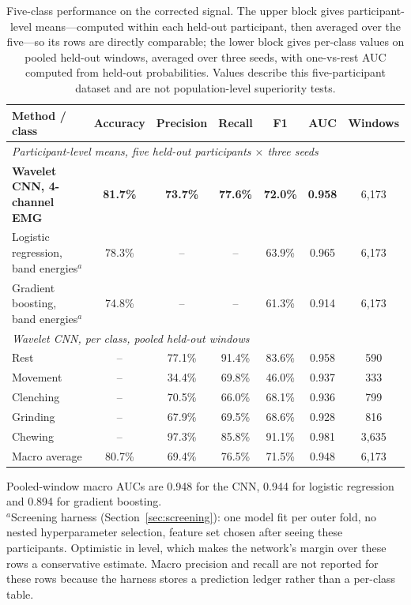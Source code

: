 \documentclass[pdflatex,sn-nature,iicol]{sn-jnl}
\begin{document}
\begin{table}[t]
  \centering
  \caption{Five-class performance on the corrected signal. The upper block gives participant-level means---computed within each held-out participant, then averaged over the five---so its rows are directly comparable; the lower block gives per-class values on pooled held-out windows, averaged over three seeds, with one-vs-rest AUC computed from held-out probabilities. Values describe this five-participant dataset and are not population-level superiority tests.}
  \label{tab:results}
  \small
  \begin{tabular*}{\textwidth}{@{\extracolsep{\fill}}lcccccc@{}}
    \toprule
    Method / class & Accuracy & Precision & Recall & F1 & AUC & Windows \\
    \midrule
    \multicolumn{7}{l}{\emph{Participant-level means, five held-out participants $\times$ three seeds}}\\
    \textbf{Wavelet CNN, 4-channel EMG} & \textbf{81.7\%} & \textbf{73.7\%} & \textbf{77.6\%} & \textbf{72.0\%} & \textbf{0.958} & 6,173 \\
    Logistic regression, band energies$^{a}$ & 78.3\% & -- & -- & 63.9\% & 0.965 & 6,173 \\
    Gradient boosting, band energies$^{a}$ & 74.8\% & -- & -- & 61.3\% & 0.914 & 6,173 \\
    \midrule
    \multicolumn{7}{l}{\emph{Wavelet CNN, per class, pooled held-out windows}}\\
    Rest & -- & 77.1\% & 91.4\% & 83.6\% & 0.958 & 590 \\
    Movement & -- & 34.4\% & 69.8\% & 46.0\% & 0.937 & 333 \\
    Clenching & -- & 70.5\% & 66.0\% & 68.1\% & 0.936 & 799 \\
    Grinding & -- & 67.9\% & 69.5\% & 68.6\% & 0.928 & 816 \\
    Chewing & -- & 97.3\% & 85.8\% & 91.1\% & 0.981 & 3,635 \\
    Macro average & 80.7\% & 69.4\% & 76.5\% & 71.5\% & 0.948 & 6,173 \\
    \bottomrule
  \end{tabular*}
  \begin{flushleft}\footnotesize
  Pooled-window macro AUCs are 0.948 for the CNN, 0.944 for logistic regression and 0.894 for gradient boosting.\\
  $^{a}$Screening harness (Section~\ref{sec:screening}): one model fit per outer fold, no nested hyperparameter selection, feature set chosen after seeing these participants. Optimistic in level, which makes the network's margin over these rows a conservative estimate. Macro precision and recall are not reported for these rows because the harness stores a prediction ledger rather than a per-class table.
  \end{flushleft}
\end{table}
\end{document}
